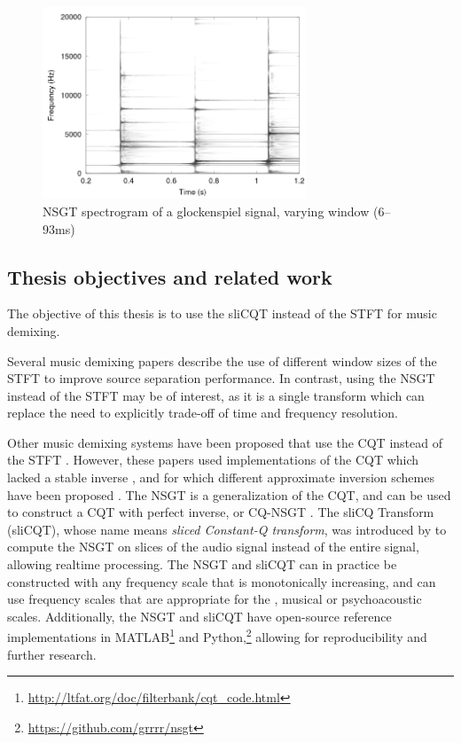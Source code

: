 \documentclass[report.tex]{subfiles}
\begin{document}
\begin{figure}[ht]
	\centering
	\includegraphics[width=0.7\textwidth]{./images-tftheory/tf_tradeoff_balasz3.png}
	\caption{NSGT spectrogram of a glockenspiel signal, varying window (6--93ms) \parencite[4]{jaillet}}
	\label{fig:nsgttradeoff}
\end{figure}

\subsection{Thesis objectives and related work}

The objective of this thesis is to use the sliCQT instead of the STFT for music demixing.

Several music demixing papers \parencite{fitzgerald1, driedger, tftradeoff1, tftradeoff2} describe the use of different window sizes of the STFT to improve source separation performance. In contrast, using the NSGT instead of the STFT may be of interest, as it is a single transform which can replace the need to explicitly trade-off of time and frequency resolution.

Other music demixing systems have been proposed that use the CQT instead of the STFT \parencite{fitzgerald2, cqtseparation, bettermusicsep}. However, these papers used implementations of the CQT which lacked a stable inverse \parencite{lackinverse}, and for which different approximate inversion schemes have been proposed \parencite{klapuricqt, fitzgeraldcqt}. The NSGT is a generalization of the CQT, and can be used to construct a CQT with perfect inverse, or CQ-NSGT \parencite{invertiblecqt, variableq1}. The sliCQ Transform (sliCQT), whose name means \textit{sliced Constant-Q transform}, was introduced by \textcite{slicq} to compute the NSGT on slices of the audio signal instead of the entire signal, allowing realtime processing. The NSGT and sliCQT can in practice be constructed with any frequency scale that is monotonically increasing, and can use frequency scales that are appropriate for the , musical or psychoacoustic scales. Additionally, the NSGT and sliCQT have open-source reference implementations in MATLAB\footnote{\url{http://ltfat.org/doc/filterbank/cqt_code.html}} and Python,\footnote{\url{https://github.com/grrrr/nsgt}} allowing for reproducibility and further research.
\end{document}
